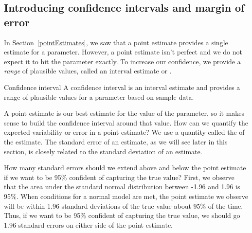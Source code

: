 \newpage
\subsection{Introducing confidence intervals and margin of error}
In Section~\ref{pointEstimates}, we saw that a point estimate provides a single estimate for a parameter.  However, a point estimate isn't perfect and we do not expect it to hit the parameter exactly.  To increase our confidence, we provide a \emph{range} of plausible values, called an interval estimate or .  


\begin{onebox}{Confidence interval}
A confidence interval is an interval estimate and provides a range of plausible values for a parameter based on sample data.
\end{onebox}

A point estimate is our best estimate for the value of the parameter, so it makes sense to build the confidence interval around that value.  How can we quantify the expected variability or error in a point estimate?  We use a quantity called the  of the estimate.  The standard error of an estimate, as we will see later in this section, is closely related to the standard deviation of an estimate.

\begin{examplewrap}
\begin{nexample}{How many standard errors should we extend above and below the point estimate if we want to be 95\% confident of capturing the true value?  }
First, we observe that the area under the standard normal distribution between -1.96 and 1.96 is 95\%.  When conditions for a normal model are met, the point estimate we observe will be within 1.96 standard deviations of the true value about 95\% of the time.  Thus, if we want to be 95\% confident of capturing the true value, we should go 1.96 standard errors on either side of the point estimate.
\end{nexample}
\end{examplewrap}

